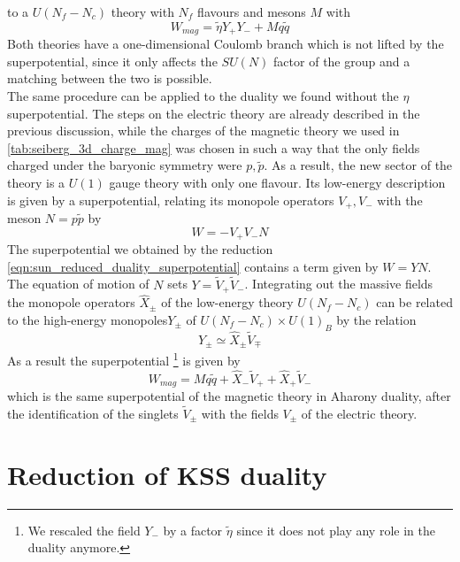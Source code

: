 to a $U(N_f - N_c)$ theory with $N_f $ flavours and mesons $M$ with
\begin{equation}
W_{mag} = \tilde{\eta} Y_+ Y_- + M q \tilde{q}
\end{equation}
Both theories have a one-dimensional Coulomb branch which is not lifted by the superpotential, since it only affects the $SU(N)$ factor of the group and a matching between the two is possible.\\
The same procedure can be applied to the duality we found without the $\eta$ superpotential.
The steps on the electric theory are already described in the previous discussion, while the charges of the magnetic theory we used in \eqref{tab:seiberg_3d_charge_mag} was chosen in such a way that the only fields charged under the baryonic symmetry were $p,\tilde{p}$.
As a result, the new sector of the theory is a $U(1)$ gauge theory with only one flavour.
Its low-energy description is given by a superpotential, relating its monopole operators $V_+,V_-$ with the meson $N= p \tilde{p}$ by
\begin{equation}
W = - V_+ V_- N
\end{equation}
The superpotential we obtained by the reduction \eqref{eqn:sun_reduced_duality_superpotential} contains a term given by $W = Y N $. The equation of motion of $N$ sets $Y= \tilde{V}_+ \tilde{V}_-$.
Integrating out the massive fields the monopole operators $\hat{X}_{\pm}$ of the low-energy theory $U(N_f - N_c)$ can be related to the high-energy monopoles$Y_{\pm}$ of $U(N_f - N_c) \times U(1)_B$ by the relation \cite{Aharony:2013dha}
\begin{equation}
Y_{\pm} \simeq \hat{X}_{\pm} \tilde{V}_{\mp}
\end{equation}
As a result the superpotential
\footnote{
  We rescaled the field $Y_-$ by a factor $\tilde{\eta}$ 
  since it does not play any role in the duality anymore. 
}
 is given by
\begin{equation}
W_{mag} = M q \tilde{q} + \hat{X}_- \tilde{V}_+ + \hat{X}_+ \tilde{V}_-
\end{equation}
which is the same superpotential of the magnetic theory in Aharony duality, after the identification of the singlets $\tilde{V}_{\pm}$ with the fields $V_{\pm}$ of the electric theory.



\section{Reduction of KSS duality}


